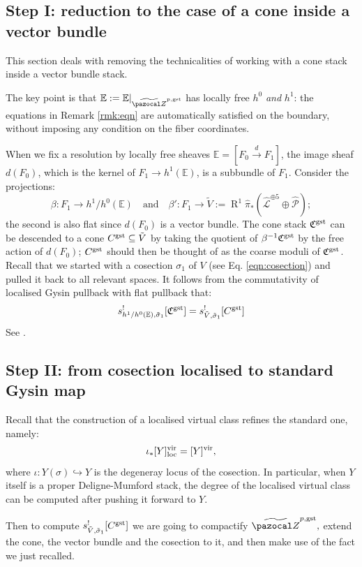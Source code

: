 \documentclass[11pt]{amsart}
\renewcommand{\to}{\rightarrow}
\newcommand{\hL}{\widehat{\mathcal L}}
\newcommand{\tZ}{\widetilde{\pazocal Z}}
\newcommand{\R}{\operatorname{R}}
\newcommand{\vir}[1]{[#1]^{\rm{vir}}}
\newcommand{\virloc}[1]{[#1]^{\rm{vir}}_{\rm{loc}}}
\theoremstyle{plain}
\theoremstyle{definition}
\begin{document}
\subsection*{Step I: reduction to the case of a cone inside a vector bundle}

This section deals with removing the technicalities of working with a cone stack inside a vector bundle stack.

The key point is that $\mathbb E:=\mathbb E\rvert_{\tZ^{p,\rm{gst}}}$ has locally free $h^0$ \emph{and} $h^1$: the equations in Remark \ref{rmk:eqn} are automatically satisfied on the boundary, without imposing any condition on the fiber coordinates.

When we fix a resolution by locally free sheaves $\mathbb E=[F_0\xrightarrow{d} F_1]$, the image sheaf $d(F_0)$, which is the kernel of $F_1\to h^1(\mathbb E)$, is a subbundle of $F_1$. Consider the projections:
\[
 \beta\colon F_1\to h^1/h^0(\mathbb E) \quad \text{and} \quad \beta'\colon F_1\to \tilde{V}:=\R^1\hat{\pi}_*(\hL^{\oplus 5}\oplus\widehat{\mathcal P});
\]
the second is also flat since $d(F_0)$ is a vector bundle. The cone stack $\mathfrak C^{\rm{gst}}$ can be descended to a cone $C^{\rm{gst}}\subseteq \tilde{V}$ by taking the quotient of $\beta^{-1}\mathfrak C^{\rm{gst}}$ by the free action of $d(F_0)$; $C^{\rm{gst}}$ should then be thought of as the coarse moduli of $\mathfrak C^{\rm{gst}}$. Recall that we started with a cosection $\sigma_1$ of $V$ (see Eq. \eqref{eqn:cosection}) and pulled it back to all relevant spaces. 
It follows from the commutativity of localised Gysin pullback with flat pullback that:
\[
 s^!_{h^1/h^0(\mathbb E),\tilde\sigma_1}[\mathfrak C^{\rm{gst}}]= s^!_{\tilde V,\tilde\sigma_1}[C^{\rm{gst}}]
\]
See \cite[Proposition 6.3]{CLpfields}.



\subsection*{Step II: from cosection localised to standard Gysin map}
Recall that the construction of a localised virtual class refines the standard one, namely:
\[\iota_*\virloc{Y}=\vir{Y},\]
where $\iota\colon Y(\sigma)\hookrightarrow Y$ is the degeneray locus of the cosection. In particular, when $Y$ itself is a proper Deligne-Mumford stack, the degree of the localised virtual class can be computed after pushing it forward to $Y$.

Then to compute $s^!_{\tilde V,\tilde\sigma_1}[C^{\rm{gst}}]$ we are going to compactify $\tZ^{p,\rm{gst}},$ extend the cone, the vector bundle and the cosection to it, and then make use of the fact we just recalled.
\end{document}

